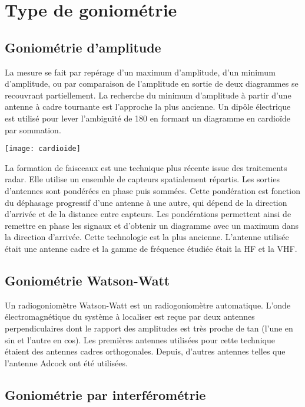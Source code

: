 \section{Type de goniométrie}

\subsection{Goniométrie d'amplitude}

	La mesure se fait par repérage d’un maximum d’amplitude, d’un minimum d’amplitude, ou par comparaison de l’amplitude en sortie de deux diagrammes se recouvrant partiellement. La recherche du minimum d’amplitude à partir d’une antenne à cadre tournante est l’approche la plus ancienne. Un dipôle électrique est utilisé pour lever l’ambiguïté de 180 en formant un diagramme en cardioïde par sommation.
	
\texttt{[image: cardioide]}
\parindent=15pt

	La formation de faisceaux est une technique plus récente issue des traitements radar. Elle utilise un ensemble de capteurs spatialement répartis. Les sorties d’antennes sont pondérées en phase puis sommées. Cette pondération est fonction du déphasage progressif d’une antenne à une autre, qui dépend de la direction d’arrivée et de la distance entre capteurs. Les pondérations permettent ainsi de remettre en phase les signaux et d’obtenir un diagramme avec un maximum dans la direction d’arrivée.
 Cette technologie est la plus ancienne. L’antenne utilisée était une antenne cadre et la gamme de fréquence étudiée était la HF et la VHF.

\subsection{Goniométrie Watson-Watt}
\label{Watson-Watt}

	Un radiogoniomètre Watson-Watt est un radiogoniomètre automatique. L’onde électromagnétique du système à localiser est reçue par deux antennes perpendiculaires dont le rapport des amplitudes est très proche de tan (l’une en sin et l’autre en cos). Les premières antennes utilisées pour cette technique étaient des antennes cadres orthogonales. Depuis, d'autres antennes telles que l'antenne Adcock ont été utilisées.

\subsection{Goniométrie par interférométrie}

